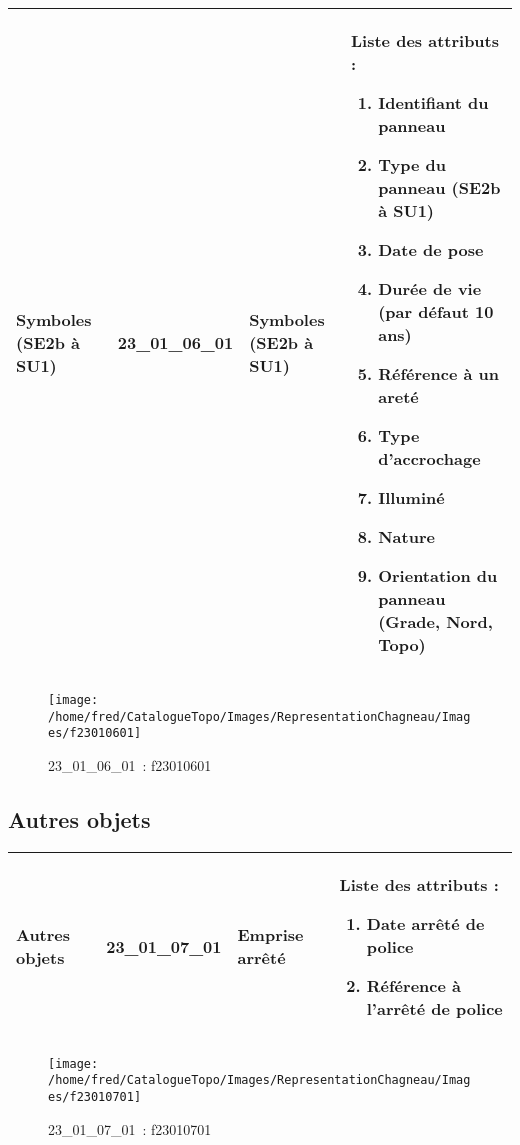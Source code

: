 \documentclass[12pt,titlepage]{book}
\begin{document}
\renewcommand{\arraystretch}{1.2}
\begin{supertabular}{|p{10cm}|c|p{13cm}|p{12cm}|}
 Symboles (SE2b à SU1) & 23\_01\_06\_01 & Symboles (SE2b à SU1) & Liste des attributs :
\begin{enumerate}
  \item Identifiant du panneau  \item Type du panneau (SE2b à SU1)  \item Date de pose  \item Durée de vie (par défaut 10 ans)  \item Référence à un areté  \item Type d'accrochage  \item Illuminé  \item Nature  \item Orientation du panneau (Grade, Nord, Topo)\end{enumerate}
\\
\hline
\end{supertabular}
\begin{figure}[h!]
  \hfill         %
  \begin{minipage}[t]{3cm}
    \begin{center}
      \texttt{[image: /home/fred/CatalogueTopo/Images/RepresentationChagneau/Images/f23010601]}
      \caption[~23\_01\_06\_01]{\small{23\_01\_06\_01~:} \tiny{f23010601}}\label{f23010601}
    \end{center}
  \end{minipage}
\end{figure}


\subsection{Autres objets}
\noindent
\vspace{\baselineskip}

\renewcommand{\arraystretch}{1.2}
\begin{supertabular}{|p{10cm}|c|p{13cm}|p{12cm}|}
 Autres objets & 23\_01\_07\_01 & Emprise arrêté & Liste des attributs :
\begin{enumerate}
  \item Date arrêté de police  \item Référence à l'arrêté de police\end{enumerate}
\\
\hline
\end{supertabular}
\begin{figure}[h!]
  \hfill         %
  \begin{minipage}[t]{3cm}
    \begin{center}
      \texttt{[image: /home/fred/CatalogueTopo/Images/RepresentationChagneau/Images/f23010701]}
      \caption[~23\_01\_07\_01]{\small{23\_01\_07\_01~:} \tiny{f23010701}}\label{f23010701}
    \end{center}
  \end{minipage}
\end{figure}
\end{document}
